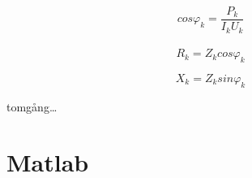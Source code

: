 \documentclass{article}
\begin{document}
\begin{equation}
  cos\varphi_k=\frac{P_k}{I_k U_k}
  \label{phik}
\end{equation}
\\
\begin{equation}
  R_k=Z_kcos\varphi_k
  \label{Rk}
\end{equation}

\begin{equation}
  X_k=Z_ksin\varphi_k
  \label{Xk}
\end{equation}

tomgång\ldots










 \newpage
 \appendix
 \section{Matlab}

 





%

%

\end{document}
